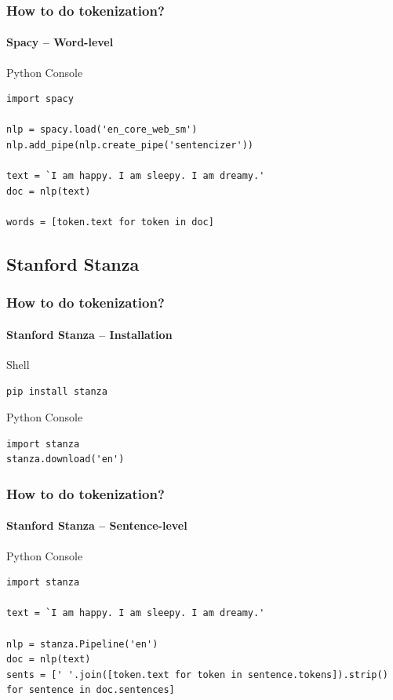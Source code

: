 \documentclass{beamer}
\begin{document}
\begin{frame}[containsverbatim]
    \frametitle{How to do tokenization?}
    \framesubtitle{Spacy -- Word-level}
    \begin{block}{Python Console}
        \begin{lstlisting}
import spacy

nlp = spacy.load('en_core_web_sm')
nlp.add_pipe(nlp.create_pipe('sentencizer'))

text = `I am happy. I am sleepy. I am dreamy.' 
doc = nlp(text)

words = [token.text for token in doc]
        \end{lstlisting}    
    \end{block}

\end{frame}


\subsection{Stanford Stanza}
\begin{frame}[containsverbatim]
    \frametitle{How to do tokenization?}
    \framesubtitle{Stanford Stanza -- Installation}
    \begin{block}{Shell}
        \begin{lstlisting}
pip install stanza
        \end{lstlisting}    
    \end{block}
    
    \begin{block}{Python Console}
        \begin{lstlisting}
import stanza
stanza.download('en')
        \end{lstlisting}    
    \end{block}
\end{frame}

\begin{frame}[containsverbatim]
    \frametitle{How to do tokenization?}
    \framesubtitle{Stanford Stanza -- Sentence-level}
    \begin{block}{Python Console}
        \begin{lstlisting}
import stanza

text = `I am happy. I am sleepy. I am dreamy.'

nlp = stanza.Pipeline('en')
doc = nlp(text)
sents = [' '.join([token.text for token in sentence.tokens]).strip() for sentence in doc.sentences]
        \end{lstlisting}    
    \end{block}

\end{frame}
\end{document}
